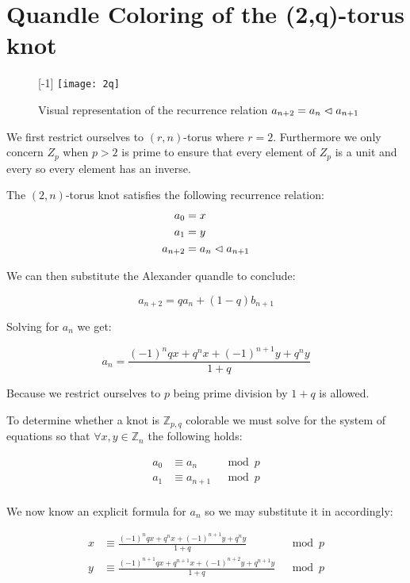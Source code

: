 \documentclass[paper.tex]{subfiles}
\begin{document}
\section{Quandle Coloring of the (2,q)-torus knot}\label{sec:2ntorus}

\begin{figure}[h]
  \centering
  \scalebox{1}[-1] {
  \texttt{[image: 2q]}
  }
  \caption{Visual representation of the recurrence relation $a_{n+2} = a_{n} \vartriangleleft a_{n+1}$~\cite{Cusick}}\label{fig:2q}
\end{figure}

We first restrict ourselves to $(r,n)$-torus where $r = 2$. Furthermore we only concern $Z_p$ when $p > 2$ is prime to ensure that every element of $Z_p$ is a unit and every so every element has an inverse.

The $(2,n)$-torus knot satisfies the following recurrence relation:
\begin{align*}
	a_0 &= x \\
	a_1 &= y \\
	a_{n+2} &= a_{n} \vartriangleleft a_{n+1} \\
\end{align*}

We can then substitute the Alexander quandle to conclude:

$$ a_{n+2} = qa_{n} + (1-q)b_{n+1} $$

Solving for $a_n$ we get:

$$ a_n = \frac{(-1)^nqx+q^nx+(-1)^{n+1}y+q^ny}{1+q} $$

Because we restrict ourselves to $p$ being prime division by $1+q$ is allowed.

To determine whether a knot is $\mathbb{Z}_{p,q}$ colorable we must solve for the system of equations so that $\forall x,y \in \mathbb{Z}_n$ the following holds:

\begin{align*}
	a_0 &\equiv a_{n}  & \mod{p} \\
	a_1 &\equiv a_{n+1} & \mod{p} \\
\end{align*}

We now know an explicit formula for $a_n$ so we may substitute it in accordingly:

\begin{align*}
	x &\equiv \frac{(-1)^nqx+q^nx+(-1)^{n+1}y+q^ny}{1+q} & \mod{p} \\
	y &\equiv \frac{(-1)^{n+1}qx+q^{n+1}x+(-1)^{n+2}y+q^{n+1}y}{1+q} & \mod{p} \\
\end{align*}
\end{document}
